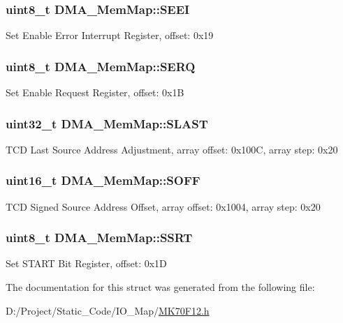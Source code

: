 \subsubsection[{S\+E\+E\+I}]{\setlength{\rightskip}{0pt plus 5cm}uint8\+\_\+t D\+M\+A\+\_\+\+Mem\+Map\+::\+S\+E\+E\+I}\label{struct_d_m_a___mem_map_a576075e4d10859c84e48e7abc1e030aa}
Set Enable Error Interrupt Register, offset\+: 0x19 \hypertarget{struct_d_m_a___mem_map_ac6934aad6952b966b2d0bed0e5d4d58c}{}
\subsubsection[{S\+E\+R\+Q}]{\setlength{\rightskip}{0pt plus 5cm}uint8\+\_\+t D\+M\+A\+\_\+\+Mem\+Map\+::\+S\+E\+R\+Q}\label{struct_d_m_a___mem_map_ac6934aad6952b966b2d0bed0e5d4d58c}
Set Enable Request Register, offset\+: 0x1\+B \hypertarget{struct_d_m_a___mem_map_a2642aa56631c9a8c9b83ca244f8ce0dd}{}
\subsubsection[{S\+L\+A\+S\+T}]{\setlength{\rightskip}{0pt plus 5cm}uint32\+\_\+t D\+M\+A\+\_\+\+Mem\+Map\+::\+S\+L\+A\+S\+T}\label{struct_d_m_a___mem_map_a2642aa56631c9a8c9b83ca244f8ce0dd}
T\+C\+D Last Source Address Adjustment, array offset\+: 0x100\+C, array step\+: 0x20 \hypertarget{struct_d_m_a___mem_map_abbbb3ec6364c286b7db38b8eefb64250}{}
\subsubsection[{S\+O\+F\+F}]{\setlength{\rightskip}{0pt plus 5cm}uint16\+\_\+t D\+M\+A\+\_\+\+Mem\+Map\+::\+S\+O\+F\+F}\label{struct_d_m_a___mem_map_abbbb3ec6364c286b7db38b8eefb64250}
T\+C\+D Signed Source Address Offset, array offset\+: 0x1004, array step\+: 0x20 \hypertarget{struct_d_m_a___mem_map_a39ea12b8e20431f54f8c6ba9f08bfc1b}{}
\subsubsection[{S\+S\+R\+T}]{\setlength{\rightskip}{0pt plus 5cm}uint8\+\_\+t D\+M\+A\+\_\+\+Mem\+Map\+::\+S\+S\+R\+T}\label{struct_d_m_a___mem_map_a39ea12b8e20431f54f8c6ba9f08bfc1b}
Set S\+T\+A\+R\+T Bit Register, offset\+: 0x1\+D 

The documentation for this struct was generated from the following file\+:\begin{DoxyCompactItemize}
\item 
D\+:/\+Project/\+Static\+\_\+\+Code/\+I\+O\+\_\+\+Map/\hyperlink{_m_k70_f12_8h}{M\+K70\+F12.\+h}\end{DoxyCompactItemize}

